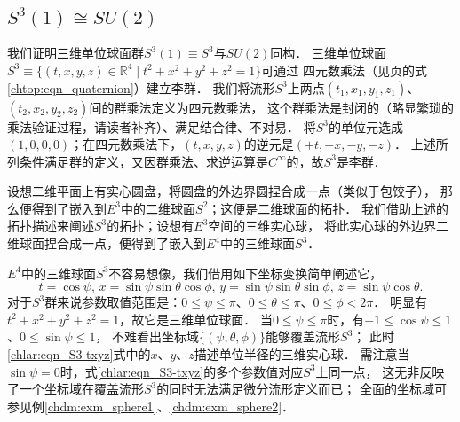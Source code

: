 \subsection{$S^3(1)\cong SU(2)$}\label{chlar:sec_S3SU2}


我们证明三维单位球面群$S^3(1)\equiv S^3$与$SU(2)$同构．
三维单位球面$S^3\equiv \{(t,x,y,z)\in \mathbb{R}^4 \mid t^2+x^2+y^2+z^2=1 \}$可通过
四元数乘法（见\pageref{chtop:eqn_quaternion}页的式\eqref{chtop:eqn_quaternion}）建立李群．
我们将流形$S^3$上两点$(t_1,x_1,y_1,z_1)$、$(t_2,x_2,y_2,z_2)$间的{\kaishu 群乘法定义为四元数乘法}，
这个群乘法是封闭的（略显繁琐的乘法验证过程，请读者补齐）、满足结合律、不对易．
将$S^3$的单位元选成$(1,0,0,0)$；在四元数乘法下，$(t,x,y,z)$的逆元是$(+t,-x,-y,-z)$．
上述所列条件满足群的定义，又因群乘法、求逆运算是$C^\infty$的，故$S^3$是李群．

设想二维平面上有实心圆盘，将圆盘的外边界圆捏合成一点（类似于包饺子），
那么便得到了嵌入到$E^3$中的二维球面$S^2$；这便是二维球面的拓扑．
我们借助上述的拓扑描述来阐述$S^3$的拓扑；设想有$E^3$空间的三维实心球，
将此实心球的外边界二维球面捏合成一点，便得到了嵌入到$E^4$中的三维球面$S^3$．

$E^4$中的三维球面$S^3$不容易想像，我们借用如下坐标变换简单阐述它，
\begin{equation}\label{chlar:eqn_S3-txyz}
	t=\cos \psi, \, x=\sin\psi  \sin\theta \cos \phi,        \,
	y=\sin \psi \sin\theta \sin \phi,\, z=\sin \psi \cos \theta .
\end{equation}
对于$S^3$群来说参数取值范围是：$0 \leqslant \psi \leqslant \pi$、$ 0\leqslant \theta \leqslant \pi $、$0\leqslant \phi  < 2\pi$．
明显有$t^2+x^2+y^2+z^2=1$，故它是三维单位球面．
当$0 \leqslant \psi \leqslant \pi$时，有$-1 \leqslant \cos \psi \leqslant 1$、$0 \leqslant \sin \psi \leqslant 1$，
不难看出坐标域$\{(\psi,\theta,\phi)\}$能够覆盖流形$S^3$；
此时\eqref{chlar:eqn_S3-txyz}式中的$x$、$y$、$z$描述单位半径的三维实心球．
需注意当$\sin\psi=0$时，式\eqref{chlar:eqn_S3-txyz}的多个参数值对应$S^3$上同一点，
这无非反映了一个坐标域在覆盖流形$S^3$的同时无法满足微分流形定义而已；
全面的坐标域可参见例\ref{chdm:exm_sphere1}、\ref{chdm:exm_sphere2}．



